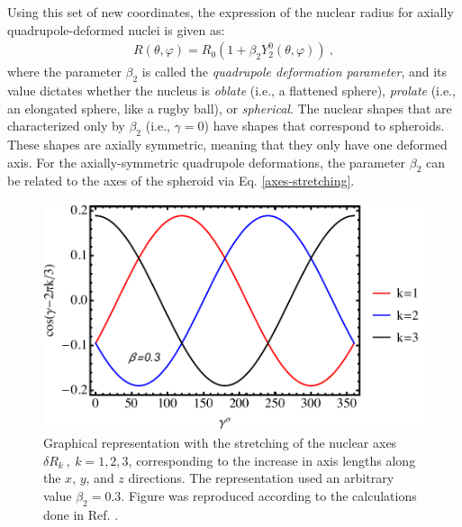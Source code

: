 Using this set of new coordinates, the expression of the nuclear radius for axially quadrupole-deformed nuclei is given as:
\begin{align}
    R(\theta,\varphi)=R_0\left(1+\beta_2 Y_2^0(\theta,\varphi)\right)\ ,
    \label{quadrupole-radius}
\end{align}
where the parameter $\beta_2$ is called the \emph{quadrupole deformation parameter}, and its value dictates whether the nucleus is \emph{oblate} (i.e., a flattened sphere), \emph{prolate} (i.e., an elongated sphere, like a rugby ball), or \emph{spherical}. The nuclear shapes that are characterized only by $\beta_2$ (i.e., $\gamma=0$) have shapes that correspond to spheroids. These shapes are axially symmetric, meaning that they only have one deformed axis. For the axially-symmetric quadrupole deformations, the parameter $\beta_2$ can be related to the axes of the spheroid via Eq. \ref{axes-stretching}.
\begin{figure}
    \centering
    \includegraphics[scale=0.7]{Chapters/Figures/nuclear-radius-elongation.pdf}
    \caption{Graphical representation with the stretching of the nuclear axes $\delta R_k\ ,\ k=1,2,3$, corresponding to the increase in axis lengths along the $x$, $y$, and $z$ directions. The representation used an arbitrary value $\beta_2=0.3$. Figure was reproduced according to the calculations done in Ref. \cite{greiner1996nuclear}.}
    \label{nuclear-radius-elongation}
\end{figure}

